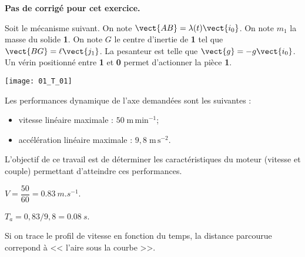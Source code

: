 \normaltrue
\correctionfalse


\setcounter{question}{0}
\ifcorrection
\else
\textbf{Pas de corrigé pour cet exercice.}
\fi

\ifprof
\else
Soit le mécanisme suivant. On note $\vect{AB}=\lambda(t)\vect{i_0}$. On note $m_1$ la masse du solide \textbf{1}.
On note $G$ le centre d'inertie de \textbf{1} tel que $\vect{BG}=\ell \vect{j_1}$. La pesanteur est telle que $\vect{g}=-g\vect{i_0}$. Un vérin positionné entre \textbf{1} et \textbf{0} permet d'actionner la pièce \textbf{1}. 
\begin{center}
\texttt{[image: 01\_T\_01]}
\end{center}



Les performances dynamique de l'axe demandées sont les suivantes : 
\begin{itemize}
\item vitesse linéaire maximale : $50 \; \text{m}\,\text{min}^{-1}$;
\item accélération linéaire maximale : $9,8 \; \text{m}\, \text{s}^{-2}$.
\end{itemize}

\begin{obj}
L'objectif de ce travail est de déterminer les caractéristiques du moteur (vitesse et couple) permettant d'atteindre ces performances.
\end{obj}
\fi

\ifprof
$V = \dfrac{50}{60} = \SI{0,83}{m.s^{-1}}$.
\else
\fi

\ifprof
$T_a =0,83/9,8 = \SI{0,08}{s}$.


\else
\fi

\ifprof
Si on trace le profil de vitesse en fonction du temps, la distance parcourue correpond à << l'aire sous la courbe >>. 

